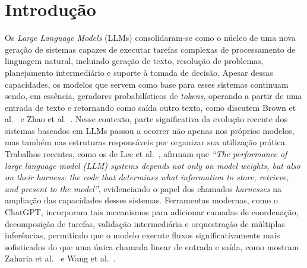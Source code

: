 \documentclass[a4paper,10pt,twocolumn]{article}
\begin{document}
\section{Introdução}

Os \textit{Large Language Models} (LLMs) consolidaram-se como o núcleo de uma nova geração de sistemas capazes de executar tarefas complexas de processamento de linguagem natural, incluindo geração de texto, resolução de problemas, planejamento intermediário e suporte à tomada de decisão. Apesar dessas capacidades, os modelos que servem como base para esses sistemas continuam sendo, em essência, geradores probabilísticos de \textit{tokens}, operando a partir de uma entrada de texto e retornando como saída outro texto, como discutem Brown et al.~\cite{brown2020language} e Zhao et al.~\cite{zhao2023survey}. Nesse contexto, parte significativa da evolução recente dos sistemas baseados em LLMs passou a ocorrer não apenas nos próprios modelos, mas também nas estruturas responsáveis por organizar sua utilização prática. Trabalhos recentes, como os de Lee et al.~\cite{lee2026metaharness}, afirmam que \textit{``The performance of large language model (LLM) systems depends not only on model weights, but also on their harness: the code that determines what information to store, retrieve, and present to the model''}, evidenciando o papel dos chamados \textit{harnesses} na ampliação das capacidades desses sistemas. Ferramentas modernas, como o ChatGPT, incorporam tais mecanismos para adicionar camadas de coordenação, decomposição de tarefas, validação intermediária e orquestração de múltiplas inferências, permitindo que o modelo execute fluxos significativamente mais sofisticados do que uma única chamada linear de entrada e saída, como mostram Zaharia et al.~\cite{zaharia2024compound} e Wang et al.~\cite{wang2025beyond}.
\end{document}
